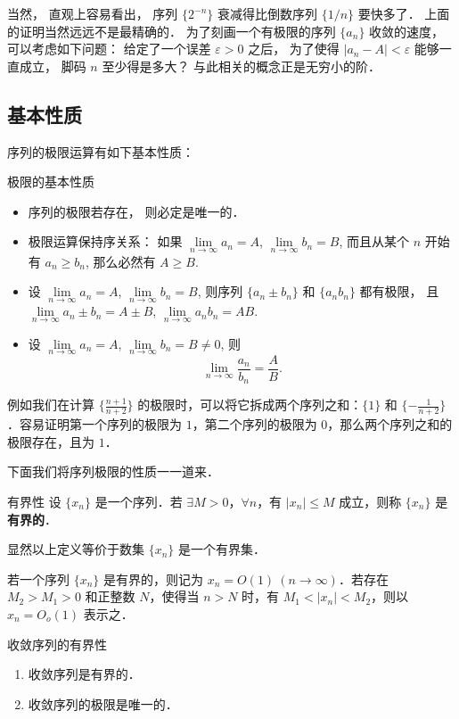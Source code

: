 当然， 直观上容易看出， 序列 $\{2^{-n}\}$ 衰减得比倒数序列 $\{1/n\}$ 要快多了． 上面的证明当然远远不是最精确的． 为了刻画一个有极限的序列 $\{a_n\}$ 收敛的速度， 可以考虑如下问题： 给定了一个误差 $\varepsilon>0$ 之后， 为了使得 $|a_n-A|<\varepsilon$ 能够一直成立， 脚码 $n$ 至少得是多大？ 与此相关的概念正是无穷小的阶． 

\subsection{基本性质}
序列的极限运算有如下基本性质：

\begin{theorem}{极限的基本性质}
\begin{itemize}
\item 序列的极限若存在， 则必定是唯一的．
\item 极限运算保持序关系： 如果 $\lim\limits_{n\to\infty}a_n=A$, $\lim\limits_{n\to\infty}b_n=B$, 而且从某个 $n$ 开始有 $a_n\geq b_n$, 那么必然有 $A\geq B$.
\item 设 $\lim\limits_{n\to\infty}a_n=A$, $\lim\limits_{n\to\infty}b_n=B$, 则序列 $\{a_n\pm b_n\}$ 和 $\{a_n b_n\}$ 都有极限， 且 $\lim\limits_{n\to\infty}a_n\pm b_n=A\pm B$, $\lim\limits_{n\to\infty}a_nb_n=AB$.
\item 设 $\lim\limits_{n\to\infty}a_n=A$, $\lim\limits_{n\to\infty}b_n=B\neq0$, 则
$$
\lim\limits_{n\to\infty}\frac{a_n}{b_n}=\frac{A}{B}.
$$
\end{itemize}
\end{theorem}

例如我们在计算 $\{\frac{n+1}{n+2}\}$ 的极限时，可以将它拆成两个序列之和：$\{1\}$ 和 $\{-\frac{1}{n+2}\}$．容易证明第一个序列的极限为 $1$，第二个序列的极限为 $0$，那么两个序列之和的极限存在，且为 $1$．

下面我们将序列极限的性质一一道来．

\begin{definition}{有界性}
设 $\{x_n\}$ 是一个序列．若 $\exists M>0$，$\forall n$，有 $|x_n|\leq M$ 成立，则称 $\{x_n\}$ 是\textbf{有界的}．

显然以上定义等价于数集 $\{x_n\}$ 是一个有界集．

若一个序列 $\{x_n\}$ 是有界的，则记为 $x_n=O(1)\ (n\rightarrow \infty)$．若存在 $M_2>M_1>0$ 和正整数 $N$，使得当 $n>N$ 时，有 $M_1<|x_n|<M_2$，则以 $x_n=O_o(1)$ 表示之．
\end{definition}
  
\begin{theorem}{收敛序列的有界性}
\begin{enumerate}
\item 收敛序列是有界的．
\item 收敛序列的极限是唯一的．
\end{enumerate}
\end{theorem}

